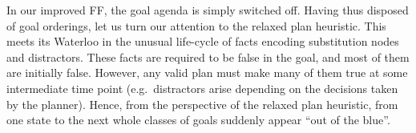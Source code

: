 












In our improved FF, the goal agenda is simply switched off. Having
thus disposed of goal orderings, let us turn our attention to the
relaxed plan heuristic. %
This meets its Waterloo in the unusual life-cycle of facts encoding
substitution nodes and distractors.
These facts are required to be false in the goal, and most of them are
initially false. However, any valid plan must make many of them true
at some intermediate time point (e.g.\ distractors arise depending on
the decisions taken by the planner). Hence, from the perspective of
the relaxed plan heuristic, from one state to the next whole classes
of goals suddenly appear ``out of the blue''.


